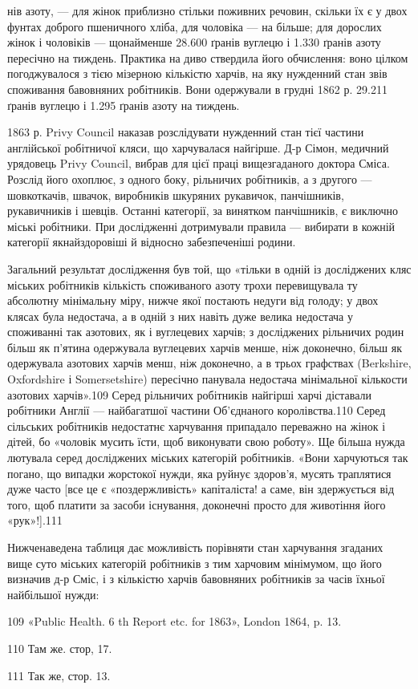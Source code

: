 нів азоту, — для жінок приблизно стільки поживних речовин,
скільки їх є у двох фунтах доброго пшеничного хліба, для чоловіка — на  більше; для дорослих
жінок і чоловіків — щонайменше
28.600 ґранів вуглецю і 1.330 ґранів азоту пересічно на тиждень.
Практика на диво ствердила його обчислення: воно цілком погоджувалося
з тією мізерною кількістю харчів, на яку нужденний
стан звів споживання бавовняних робітників. Вони одержували
в грудні 1862 р. 29.211 ґранів вуглецю і 1.295 ґранів азоту
на тиждень.

1863 р. Privy Council наказав розслідувати нужденний стан
тієї частини англійської робітничої кляси, що харчувалася найгірше.
Д-р Сімон, медичний урядовець Privy Council, вибрав
для цієї праці вищезгаданого доктора Сміса. Розслід його охоплює,
з одного боку, рільничих робітників, а з другого — шовкоткачів,
швачок, виробників шкуряних рукавичок, панчішників,
рукавичників і шевців. Останні категорії, за винятком панчішників,
є виключно міські робітники. При дослідженні дотримували
правила — вибирати в кожній категорії якнайздоровіші
й відносно забезпеченіші родини.

Загальний результат дослідження був той, що «тільки в
одній із досліджених кляс міських робітників кількість споживаного
азоту трохи перевищувала ту абсолютну мінімальну
міру, нижче якої постають недуги від голоду; у двох клясах
була недостача, а в одній з них навіть дуже велика недостача
у споживанні так азотових, як і вуглецевих харчів; з досліджених
рільничих родин більш як п’ятина одержувала вуглецевих
харчів менше, ніж доконечно, більш як  одержувала
азотових харчів менш, ніж доконечно, а в трьох графствах
(Berkshire, Oxfordshire і Somersetshire) пересічно панувала недостача
мінімальної кількости азотових харчів».109 Серед рільничих
робітників найгірші харчі діставали робітники Англії —
найбагатшої частини Об’єднаного королівства.110 Серед сільських
робітників недостатнє харчування припадало переважно
на жінок і дітей, бо «чоловік мусить їсти, щоб виконувати свою
роботу». Ще більша нужда лютувала серед досліджених міських
категорій робітників. «Вони харчуються так погано, що випадки
жорстокої нужди, яка руйнує здоров’я, мусять траплятися дуже
часто [все це є «поздержливість» капіталіста! а саме, він здержується
від того, щоб платити за засоби існування, доконечні
просто для животіння його «рук»!].111

Нижченаведена таблиця дає можливість порівняти стан харчування
згаданих вище суто міських категорій робітників з
тим харчовим мінімумом, що його визначив д-р Сміс, і з
кількістю харчів бавовняних робітників за часів їхньої найбільшої
нужди:

109 «Public Health. 6 th Report etc. for 1863», London 1864, p. 13.

110 Там же. стор, 17.

111 Так же, стор. 13.
